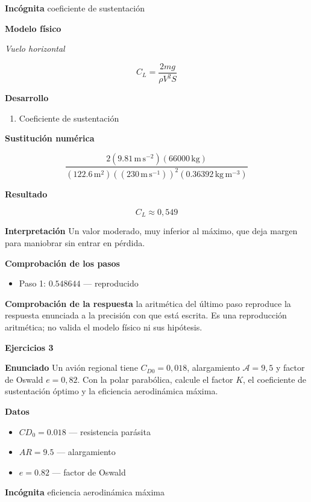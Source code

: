 \documentclass[10pt,openany]{book}
\begin{document}
\noindent\textbf{Incógnita}
coeficiente de sustentación

\noindent\textbf{Modelo físico}

\noindent\textit{Vuelo horizontal}

\[
C_L = \frac{2 m g}{\rho V^{2} S}
\]

\noindent\textbf{Desarrollo}
\begin{enumerate}
\item
Coeficiente de sustentación
\end{enumerate}

\noindent\textbf{Sustitución numérica}

\[
\frac{2 \left(9.81\,\mathrm{m}\,\mathrm{s}^{-2}\right) \left(66000\,\mathrm{kg}\right)}{\left(122.6\,\mathrm{m}^{2}\right) \left(\left(230\,\mathrm{m}\,\mathrm{s}^{-1}\right)\right)^{2} \left(0.36392\,\mathrm{kg}\,\mathrm{m}^{-3}\right)}
\]

\noindent\textbf{Resultado}

\[
C_L \approx 0{,}549
\]

\noindent\textbf{Interpretación}
Un valor moderado, muy inferior al máximo, que deja margen para maniobrar sin entrar en pérdida.

\noindent\textbf{Comprobación de los pasos}
\begin{itemize}
\item Paso 1: $0.548644$ — reproducido
\end{itemize}

\noindent\textbf{Comprobación de la respuesta} la aritmética del último paso reproduce la respuesta enunciada a la precisión con que está escrita. Es una reproducción aritmética; no valida el modelo físico ni sus hipótesis.

\noindent\textbf{Ejercicios 3}

\noindent\textbf{Enunciado}
Un avión regional tiene \(C_{D0} = 0{,}018\), alargamiento \(\mathcal{A} = 9{,}5\) y factor de Oswald \(e = 0{,}82\). Con la polar parabólica, calcule el factor \(K\), el coeficiente de sustentación óptimo y la eficiencia aerodinámica máxima.

\noindent\textbf{Datos}
\begin{itemize}
\item $CD_{0} = 0.018$ — resistencia parásita
\item $AR = 9.5$ — alargamiento
\item $e = 0.82$ — factor de Oswald
\end{itemize}

\noindent\textbf{Incógnita}
eficiencia aerodinámica máxima
\end{document}
